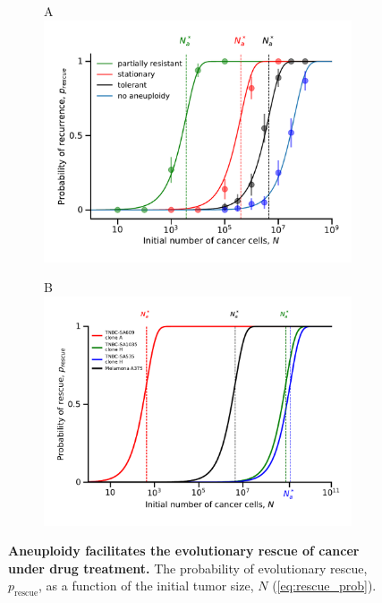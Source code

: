 \documentclass[12pt]{extarticle}
\newcommand{\presc}{p_\text{rescue}}
\begin{document}
\begin{figure}
\begin{subfigure}{0.48\textwidth}
A\\
\includegraphics[width=1\textwidth]{Figures/ProbvNPlot.pdf}
\end{subfigure}
\begin{subfigure}{0.52\textwidth}
B\\
\includegraphics[width=1\textwidth]{Figures/PDXModelProb.pdf}
\end{subfigure}
\caption{\textbf{Aneuploidy facilitates the evolutionary rescue of cancer under drug treatment.}
The probability of evolutionary rescue, $\presc$, as a function of the initial tumor size, $N$ (\cref{eq:rescue_prob}). 
}
\end{figure}
\end{document}
